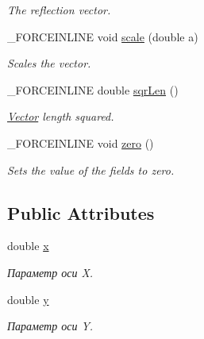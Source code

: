 \begin{DoxyCompactItemize}
\begin{DoxyCompactList}\small\item\em The reflection vector. \end{DoxyCompactList}\item 
\hypertarget{classbt_1_1vector2d_abbd86bc4a84d5df2437dd75b03d7d808}{\-\_\-\-F\-O\-R\-C\-E\-I\-N\-L\-I\-N\-E void \hyperlink{classbt_1_1vector2d_abbd86bc4a84d5df2437dd75b03d7d808}{scale} (double a)}\label{classbt_1_1vector2d_abbd86bc4a84d5df2437dd75b03d7d808}

\begin{DoxyCompactList}\small\item\em Scales the vector. \end{DoxyCompactList}\item 
\hypertarget{classbt_1_1vector2d_a587e2be5203b88741378172daad1f112}{\-\_\-\-F\-O\-R\-C\-E\-I\-N\-L\-I\-N\-E double \hyperlink{classbt_1_1vector2d_a587e2be5203b88741378172daad1f112}{sqr\-Len} ()}\label{classbt_1_1vector2d_a587e2be5203b88741378172daad1f112}

\begin{DoxyCompactList}\small\item\em \hyperlink{classbt_1_1_vector}{Vector} length squared. \end{DoxyCompactList}\item 
\hypertarget{classbt_1_1vector2d_a1962d5f5c4e48a9059f73e338926e5e4}{\-\_\-\-F\-O\-R\-C\-E\-I\-N\-L\-I\-N\-E void \hyperlink{classbt_1_1vector2d_a1962d5f5c4e48a9059f73e338926e5e4}{zero} ()}\label{classbt_1_1vector2d_a1962d5f5c4e48a9059f73e338926e5e4}

\begin{DoxyCompactList}\small\item\em Sets the value of the fields to zero. \end{DoxyCompactList}\end{DoxyCompactItemize}
\subsection*{Public Attributes}
\begin{DoxyCompactItemize}
\item 
\hypertarget{classbt_1_1vector2d_a4e5d7f4150c6064f249336434da22008}{double \hyperlink{classbt_1_1vector2d_a4e5d7f4150c6064f249336434da22008}{x}}\label{classbt_1_1vector2d_a4e5d7f4150c6064f249336434da22008}

\begin{DoxyCompactList}\small\item\em Параметр оси X. \end{DoxyCompactList}\item 
\hypertarget{classbt_1_1vector2d_ae9ed0309f6a735df638035863d0e19f1}{double \hyperlink{classbt_1_1vector2d_ae9ed0309f6a735df638035863d0e19f1}{y}}\label{classbt_1_1vector2d_ae9ed0309f6a735df638035863d0e19f1}

\begin{DoxyCompactList}\small\item\em Параметр оси Y. \end{DoxyCompactList}\end{DoxyCompactItemize}
